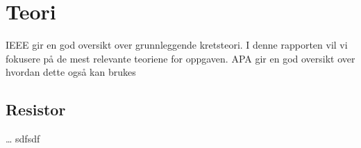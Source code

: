 \section{Teori}
IEEE \parencite{ieeeGuide} gir en god oversikt over grunnleggende kretsteori. 
I denne rapporten vil vi fokusere på de mest relevante teoriene for oppgaven. 
APA\cite{apaGuide} gir en god oversikt over hvordan dette også kan brukes

\subsection{Resistor}
\dots
sdfsdf
